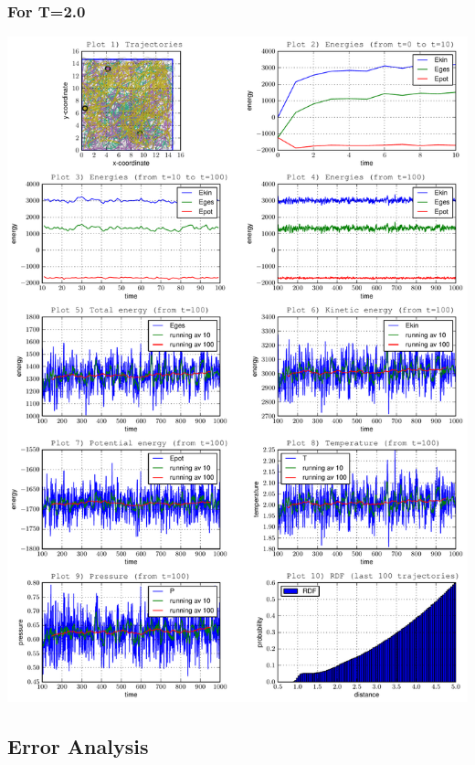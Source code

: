 \documentclass[12pt,a4paper]{scrartcl}
\begin{document}
\subsubsection*{For T=2.0}
\includegraphics[page=1, scale=0.63]{../plots/all20}

\subsection{Error Analysis}
\end{document}
